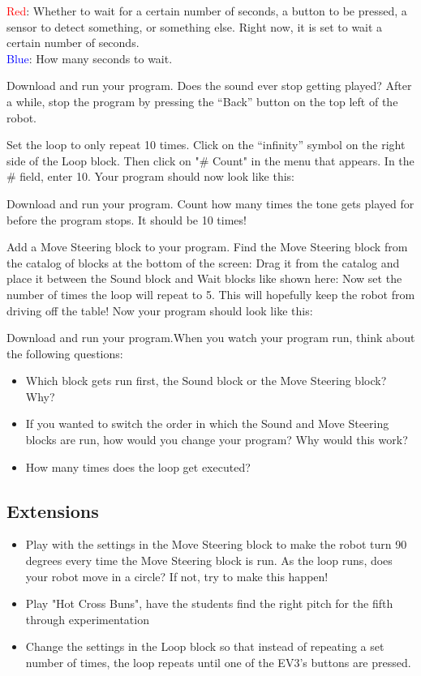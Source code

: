 \documentclass{lessonplan}
\begin{document}
    \textcolor{red}{Red}: Whether to wait for a certain number of seconds, a button to be pressed, a sensor to detect something, or something else. Right now, it is set to wait a certain number of seconds. \hfill \\
    \textcolor{blue}{Blue}: How many seconds to wait.
    \par
    Download and run your program.
    Does the sound ever stop getting played? After a while, stop the program by pressing the “Back” button on the top left of the robot.
    \par
    Set the loop to only repeat 10 times.
    Click on the “infinity” symbol on the right side of the Loop block. Then click on "\# Count" in the menu that appears. In the \# field, enter 10. Your program should now look like this:
    \par
    Download and run your program.
    Count how many times the tone gets played for before the program stops. It should be 10 times!
    \par
    Add a Move Steering block to your program.
    Find the Move Steering block from the catalog of blocks at the bottom of the screen:
    Drag it from the catalog and place it between the Sound block and Wait blocks like shown here:
    Now set the number of times the loop will repeat to 5. This will hopefully keep the robot from driving off the table! Now your program should look like this:
    \par
    Download and run your program.When you watch your program run, think about the following questions:
    \begin{itemize}
        \item Which block gets run first, the Sound block or the Move Steering block? Why?
        \item If you wanted to switch the order in which the Sound and Move Steering blocks are run, how would you change your program? Why would this work?
        \item How many times does the loop get executed?
    \end{itemize}

    \subsection{Extensions}
      \begin{itemize}
        \item Play with the settings in the Move Steering block to make the robot turn 90 degrees every time the Move Steering block is run. As the loop runs, does your robot move in a circle? If not, try to make this happen!
        \item Play "Hot Cross Buns", have the students find
          the right pitch for the fifth through experimentation
        \item Change the settings in the Loop block so that instead of repeating a set number of times, the loop repeats until one of the EV3’s buttons are pressed.
      \end{itemize}
\end{document}
